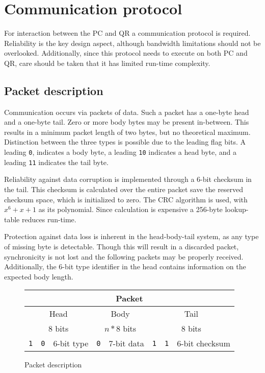 \documentclass[10pt]{article}
\begin{document}
\section*{Communication protocol}

For interaction between the PC and QR a communication protocol is required. Reliability is the key design aspect, although bandwidth limitations should not be overlooked. Additionally, since this protocol needs to execute on both PC and QR, care should be taken that it has limited run-time complexity.

\subsection*{Packet description}

Communication occurs via packets of data. Such a packet has a one-byte head and a one-byte tail. Zero or more body bytes may be present in-between. This results in a minimum packet length of two bytes, but no theoretical maximum. Distinction between the three types is possible due to the leading flag bits. A leading \texttt{0}, indicates a body byte, a leading \texttt{10} indicates a head byte, and a leading \texttt{11} indicates the tail byte.

Reliability against data corruption is implemented through a 6-bit checksum in the tail. This checksum is calculated over the entire packet save the reserved checksum space, which is initialized to zero. The CRC algorithm is used, with $x^6 + x + 1$ as its polynomial. Since calculation is expensive a 256-byte lookup-table reduces run-time.

Protection against data loss is inherent in the head-body-tail system, as any type of missing byte is detectable. Though this will result in a discarded packet, synchronicity is not lost and the following packets may be properly received. Additionally, the 6-bit type identifier in the head contains information on the expected body length.

\begin{figure}[h]
	\caption{Packet description}
	\begin{tabular}{|c|c|c| c|c |c|c|c|}

		\hline
		\multicolumn{8}{|c|}{Packet} \\

		\hline
		\multicolumn{3}{|c|}{Head}	&
		\multicolumn{2}{c}{Body}	&
		\multicolumn{3}{|c|}{Tail}	\\
		\hline

		\multicolumn{3}{|c|}{8 bits}	&
		\multicolumn{2}{c}{$n * 8$ bits}	&
		\multicolumn{3}{|c|}{8 bits}	\\
		\hline

		\texttt{1}	&	\texttt{0}	&	6-bit type	&
		\texttt{0}	&	7-bit data	&
		\texttt{1}	&	\texttt{1}	&	6-bit checksum	\\

		\hline
	\end{tabular}
\end{figure}
\end{document}
